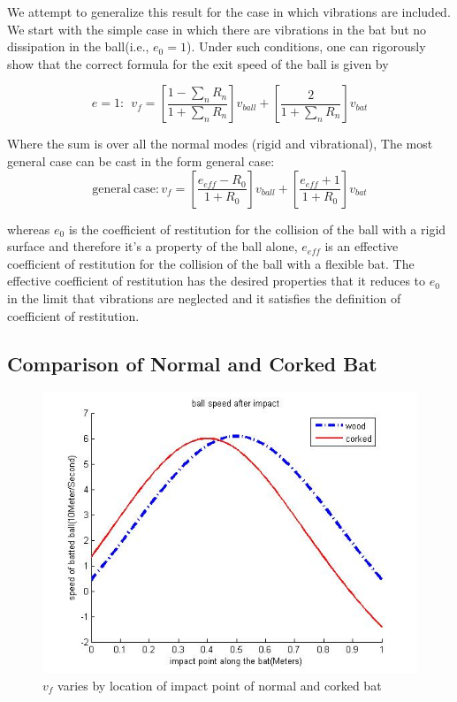 \documentclass[12pt]{article}
\begin{document}
We attempt to generalize this result for the case in which vibrations are included.
We start with the simple case in
which there are vibrations in the bat but no dissipation in the
ball(i.e., $e_0=1$).
Under such conditions, one can rigorously
show that the correct formula for the exit speed of the ball is given by

\begin{equation}
e=1: \ \ v_f=[\frac{1-\sum_n R_n}{1+\sum_nR_n}]v_{ball}+[\frac{2}{1+\sum_n R_n}]v_{bat}
\end{equation}

Where the sum is over all the normal modes
(rigid and vibrational),
The most general case can be cast in the form
general case:
\begin{equation}
\mathrm{general\ case}: v_f=[\frac{e_{eff}-R_0}{1+R_0}]v_{ball}+
[\frac{e_{eff}+1}{1+R_0}]v_{bat}\label{equ:general}
\end{equation}

whereas $e_0$ is the coefficient of restitution for the collision of the ball with a rigid surface and therefore it's a
property of the ball alone, $e_{eff}$ is an effective coefficient of restitution for
the collision of the ball with a flexible bat. The effective coefficient of restitution has the desired
properties that it reduces to $e_0$ in the limit that vibrations are neglected and it satisfies the definition of coefficient of restitution.

\subsection{Comparison of Normal and Corked Bat}

\begin{center}
\begin{figure}[htpb]
\centering
\includegraphics[scale=0.5]{corked}
\caption{$v_f$ varies by location of impact point of normal and corked bat}\label{fig:corked}
\end{figure}
\end{center}
\end{document}
